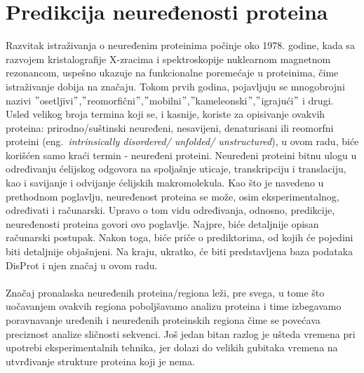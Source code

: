 
\chapter{Predikcija neuređenosti proteina} %
\label{predikcija} %

Razvitak istraživanja o neuređenim proteinima počinje oko 1978. godine, kada sa razvojem kristalografije X-zracima i spektroskopije nuklearnom magnetnom rezonancom, uspešno ukazuje na funkcionalne poremećaje u proteinima, čime istraživanje dobija na značaju. Tokom prvih godina, pojavljuju se mnogobrojni nazivi $"$osetljivi$"$,$"$reomorfični$"$,$"$mobilni$"$,$"$kameleonski$"$,$"$igrajući$"$ i drugi. Usled velikog broja termina koji se, i kasnije, koriste za opisivanje ovakvih proteina: prirodno/suštinski neuređeni, nesavijeni, denaturisani ili reomorfni proteini (eng.~{\em intrinsically disordered/ unfolded/ unstructured}), u ovom radu, biće korišćen samo kraći termin - neuređeni proteini. 
Neuređeni proteini bitnu ulogu u određivanju ćelijskog odgovora na spoljašnje uticaje, transkripciju i translaciju, kao i savijanje i odvijanje ćelijskih makromolekula.
Kao što je navedeno u prethodnom poglavlju, neuređenost proteina se može, osim eksperimentalnog, određivati i računarski. Upravo o tom vidu određivanja, odnosno, predikcije, neuređenosti proteina govori ovo poglavlje. Najpre, biće detaljnije opisan računarski postupak. Nakon toga, biće priče o prediktorima, od kojih će pojedini biti detaljnije objašnjeni. Na kraju, ukratko, će biti predstavljena baza podataka DisProt i njen značaj u ovom radu.~\cite{IDPsAtoZ,JKd, IDPTompa}\\\\
Značaj pronalaska neuređenih proteina/regiona leži, pre svega, u tome što uočavanjem ovakvih regiona poboljšavamo analizu proteina i time izbegavamo poravnavanje uređenih i neuređenih proteinskih regiona čime se povećava preciznost analize sličnosti sekvenci. Još jedan bitan razlog je ušteda vremena pri upotrebi eksperimentalnih tehnika, jer dolazi do velikih gubitaka vremena na utvrđivanje strukture proteina koji je nema.~\cite{POverview, COverview} 



